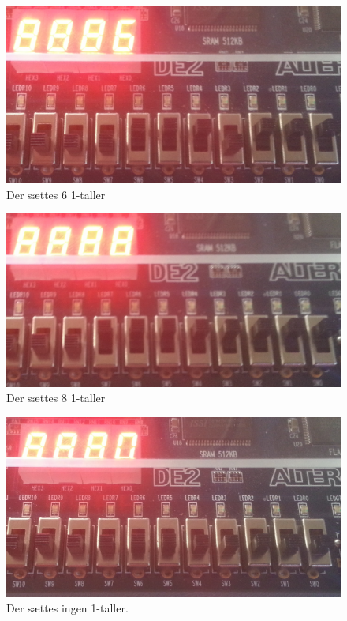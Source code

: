 \begin{enumerate}
	\begin{figure}[h]
		\centering
		\includegraphics[scale=0.15]{pictures/Oevelse5/opg5/1count_6.JPG}
		\caption{Der sættes 6 1-taller}
		\label{fig:1count6}
	\end{figure}
	\begin{figure}[h]
		\centering
		\includegraphics[scale=0.15]{pictures/Oevelse5/opg5/1count_8.JPG}
		\caption{Der sættes 8 1-taller}
		\label{fig:1count8}
	\end{figure}
	\begin{figure}[h]
		\centering
		\includegraphics[scale=0.15]{pictures/Oevelse5/opg5/1count_0.JPG}
		\caption{Der sættes ingen 1-taller.}
		\label{fig:1count0}
	\end{figure}
\end{enumerate}